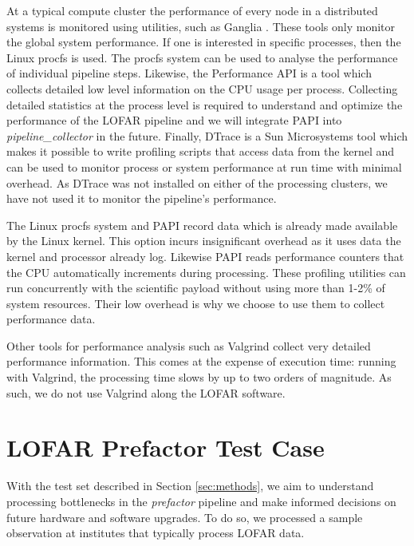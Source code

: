 At a typical compute cluster the performance of every node in a distributed systems is monitored using utilities, such as Ganglia \citep{ganglia}. These tools only monitor the global system performance. 
If one is interested in specific processes, then the Linux procfs \citep{procfs} is used. The procfs system can be used to analyse the performance of individual pipeline steps. Likewise, the Performance API \citep[PAPI,][]{papi} is a tool which collects detailed low level information on the CPU usage per process. Collecting detailed statistics at the process level is required to understand and optimize the performance of the LOFAR pipeline and we will integrate PAPI into \textit{pipeline\_collector} in the future. Finally, DTrace\citep{dtrace} is a Sun Microsystems tool which makes it possible to write profiling scripts that access data from the kernel and can be used to monitor process or system performance at run time with minimal overhead. As DTrace was not installed on either of the processing clusters, we have not used it to monitor the pipeline's performance. 

The Linux procfs system and PAPI record data which is already made available by the Linux kernel. This option incurs insignificant overhead as it uses data the kernel and processor already log. Likewise PAPI reads performance counters that the CPU automatically increments during processing. These profiling utilities can run concurrently with the scientific payload without using more than 1-2\% of system resources. Their low overhead is why we choose to use them to collect performance data. 

Other tools for performance analysis such as Valgrind \citep{valgrind} collect very detailed performance information. This comes at the expense of execution time: running with Valgrind, the processing time slows by up to two orders of magnitude. As such, we do not use Valgrind along the LOFAR software. 



\section{LOFAR Prefactor Test Case}\label{sec:results}
  
With the test set described in Section \ref{sec:methods}, we aim to understand processing bottlenecks in the \textit{prefactor} pipeline and make informed decisions on future hardware and software upgrades. To do so, we processed a sample observation at institutes that typically process LOFAR data. 

